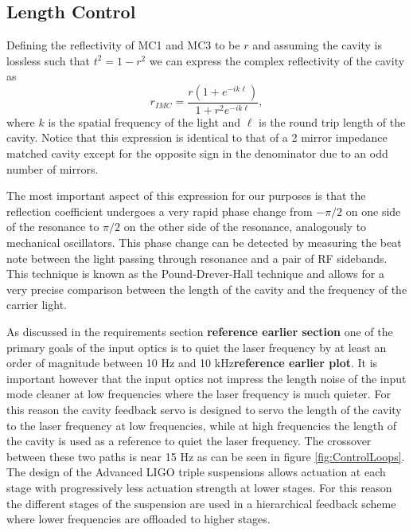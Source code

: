 \documentclass[10pt]{article}
\begin{document}
\subsection{Length Control}
Defining the reflectivity of MC1 and MC3 to be $r$ and assuming the cavity is lossless such that 
$t^2 = 1-r^2$ we can express the complex reflectivity of the cavity as 
\begin{equation}
	r_{IMC} = \frac{r(1+e^{-ik\ell})}{1+r^2e^{-ik\ell}},
\end{equation}
where $k$ is the spatial frequency of the light and $\ell$ is the round trip length of the cavity.  
Notice that this expression is identical to that of a 2 mirror impedance matched cavity except 
for the opposite sign in the denominator due to an odd number of mirrors.  

The most important aspect of this expression for our purposes is that the reflection coefficient 
undergoes a very rapid phase change from $-\pi/2$ on one side of the resonance to $\pi/2$ 
on the other side of the resonance, analogously to mechanical oscillators.  
This phase change can be detected by measuring the beat note between the light passing 
through resonance and a pair of RF sidebands.  
This technique is known as the Pound-Drever-Hall technique\cite{EricBlack}\cite{DreverHall} 
and allows for a very precise comparison between the length of the cavity and the frequency 
of the carrier light.  

As discussed in the requirements section \textbf{reference earlier section} one of the primary 
goals of the input optics is to quiet the laser frequency by at least an order of magnitude 
between 10 Hz and 10 kHz\textbf{reference earlier plot}.  
It is important however that the input optics not impress the length noise of the input mode 
cleaner at low frequencies where the laser frequency is much quieter.  
For this reason the cavity feedback servo is designed to servo the length of the 
cavity to the laser frequency at low frequencies, while at high frequencies the 
length of the cavity is used as a reference to quiet the laser frequency.  
The crossover between these two paths is near 15 Hz as can be seen in figure 
\ref{fig:ControlLoops}.  
The design of the Advanced LIGO triple suspensions allows actuation at each stage 
with progressively less actuation strength at lower stages.  
For this reason the different stages of the suspension are used in a hierarchical 
feedback scheme where lower frequencies are offloaded to higher stages.  
\end{document}

